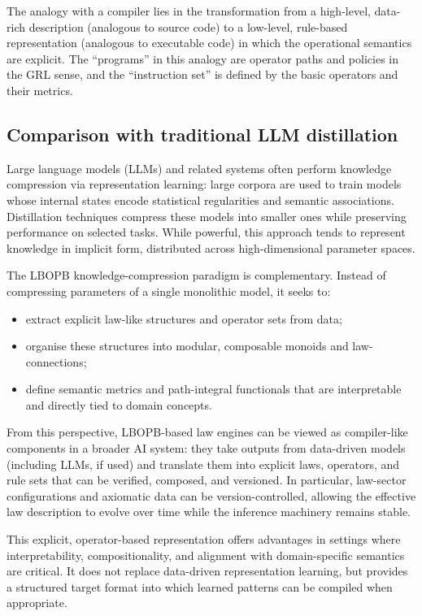 \documentclass[11pt]{book}
\theoremstyle{plain}
\theoremstyle{definition}
\theoremstyle{remark}
\begin{document}
The analogy with a compiler lies in the transformation from a
high-level, data-rich description (analogous to source code) to a
low-level, rule-based representation (analogous to executable code) in
which the operational semantics are explicit. The ``programs'' in this
analogy are operator paths and policies in the GRL sense, and the
``instruction set'' is defined by the basic operators and their
metrics.

\subsection*{Comparison with traditional LLM distillation}

Large language models (LLMs) and related systems often perform
knowledge compression via representation learning: large corpora are
used to train models whose internal states encode statistical regularities
and semantic associations. Distillation techniques compress these
models into smaller ones while preserving performance on selected
tasks. While powerful, this approach tends to represent knowledge in
implicit form, distributed across high-dimensional parameter spaces.

The LBOPB knowledge-compression paradigm is complementary. Instead of
compressing parameters of a single monolithic model, it seeks to:

\begin{itemize}
  \item extract explicit law-like structures and operator sets from
        data;
  \item organise these structures into modular, composable monoids
        and law-connections;
  \item define semantic metrics and path-integral functionals that are
        interpretable and directly tied to domain concepts.
\end{itemize}

From this perspective, LBOPB-based law engines can be viewed as
compiler-like components in a broader AI system: they take outputs
from data-driven models (including LLMs, if used) and translate them
into explicit laws, operators, and rule sets that can be verified,
composed, and versioned. In particular, law-sector configurations and
axiomatic data can be version-controlled, allowing the effective law
description to evolve over time while the inference machinery remains
stable.

This explicit, operator-based representation offers advantages in
settings where interpretability, compositionality, and alignment with
domain-specific semantics are critical. It does not replace data-driven
representation learning, but provides a structured target format into
which learned patterns can be compiled when appropriate.
\end{document}

